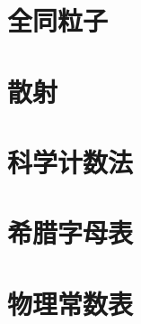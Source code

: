 \documentclass[twoside,b5paper,11pt]{book}
\begin{document}









\chapter{全同粒子}











\chapter{散射}





\appendix

\chapter{科学计数法}



\chapter{希腊字母表}


\chapter{物理常数表}



\printindex

\newpage


\end{document}
